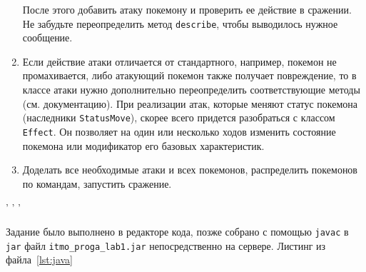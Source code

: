 \begin{enumerate}
        После этого добавить атаку покемону и проверить ее действие в сражении.
        Не забудьте переопределить метод \verb|describe|, чтобы выводилось нужное сообщение.
        \item Если действие атаки отличается от стандартного, например, покемон не промахивается, либо атакующий покемон также получает повреждение, то в классе атаки нужно дополнительно переопределить соответствующие методы (см.
        документацию).
        При реализации атак, которые меняют статус покемона (наследники \verb|StatusMove|), скорее всего придется разобраться с классом \verb|Effect|.
        Он позволяет на один или несколько ходов изменить состояние покемона или модификатор его базовых характеристик.
        \item Доделать все необходимые атаки и всех покемонов, распределить покемонов по командам, запустить сражение.
    \end{enumerate}


    \begin{center}
        ' ' '
    \end{center}

    \newpage
    Задание было выполнено в редакторе кода, позже собрано с помощью \verb|javac| в \verb|jar| файл \verb|itmo_proga_lab1.jar| непосредственно на сервере.
    Листинг из файла~\ref{lst:java}
    





